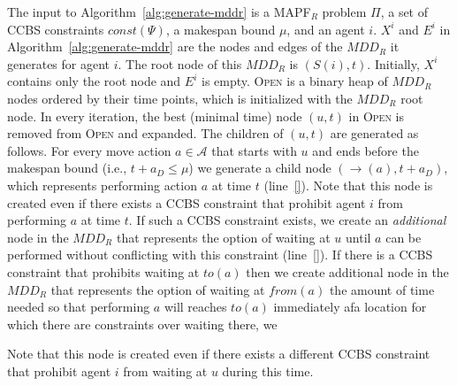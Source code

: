 \documentclass[review]{elsarticle}
\newcommand{\tuple}[1]{\ensuremath{\left \langle #1 \right \rangle }}
\newcommand{\mddr}{\ensuremath{MDD_R}\xspace}
\newcommand{\source}{\ensuremath{S}\xspace}
\newcommand{\fromv}{\ensuremath{\mathit{from}}\xspace}
\newcommand{\tov}{\ensuremath{\mathit{to}}\xspace}
\newcommand\roni[1]{\nb{\textbf{Roni:}}{green}{#1}}
\newcommand\pavel[1]{\nb{\textbf{Pavel:}}{blue}{#1}}
\newcommand{\ccbs}{\ac{CCBS}\xspace}
\newcommand{\csipp}{\ac{CSIPP}\xspace}
\newcommand{\mapfr}{\ac{MAPF}$_R$\xspace}
\newcommand{\musmtccbs}{\ensuremath{\mu}SMT-CCBS\xspace}
\newcommand{\const}{\textit{const}\xspace}
\newcommand{\OPEN}{\textsc{Open}\xspace}
\begin{document}

The input to Algorithm~\ref{alg:generate-mddr} is a \mapfr problem $\Pi$, 
a set of \ccbs constraints $\const(\Psi)$, 
a makespan bound $\mu$, 
and an agent $i$.  
$X^i$ and $E^i$ in Algorithm~\ref{alg:generate-mddr} are the nodes and edges of the \mddr it generates for agent $i$. 
The root node of this \mddr is $(\source(i),t)$. 
Initially, $X^i$ contains only the root node and $E^i$ is empty. 
\OPEN is a binary heap of \mddr nodes ordered by their time points, 
which is initialized with the \mddr root node. 
In every iteration, the best (minimal time) node $(u,t)$ in \OPEN is removed from \OPEN and expanded. 
The children of $(u,t)$ are generated as follows. 
For every move action $a\in \mathcal{A}$ that starts with $u$ and ends before the makespan bound (i.e., $t+a_D\leq \mu$) 
we generate a child node $(\to(a),t+a_D)$, which represents performing action $a$ at time $t$ (line~\ref{}). 
Note that this node is created even if there exists a \ccbs constraint that prohibit agent $i$ from performing $a$ at time $t$. 
If such a \ccbs constraint exists, we create an \emph{additional} node in the \mddr that represents the option of waiting at $u$ until $a$ can be performed without conflicting with this constraint (line~\ref{}). 
If there is a \ccbs constraint that prohibits waiting at $\tov(a)$ then we create additional node in the \mddr that represents the option of waiting at $\fromv(a)$ the amount of time needed so that  performing $a$ will reaches $\tov(a)$ immediately afa location for which there are constraints over waiting there, 
we 

Note that this node is created even if there exists a different \ccbs constraint that prohibit agent $i$ from waiting at $u$ during this time. 


\end{document}
